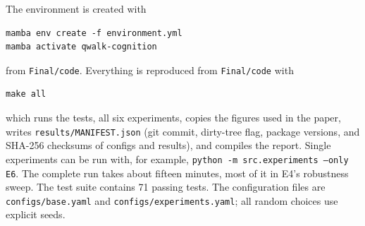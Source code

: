 The environment is created with
\begin{verbatim}
mamba env create -f environment.yml
mamba activate qwalk-cognition
\end{verbatim}
from \texttt{Final/code}. Everything is reproduced from \texttt{Final/code} with
\begin{verbatim}
make all
\end{verbatim}
which runs the tests, all six experiments, copies the figures used in the paper,
writes \texttt{results/MANIFEST.json} (git commit, dirty-tree flag, package
versions, and SHA-256 checksums of configs and results), and compiles the report.
Single experiments can be run with, for example,
\texttt{python -m src.experiments --only E6}. The complete run takes about
fifteen minutes, most of it in E4's robustness sweep. The test suite contains 71
passing tests. The configuration files are \texttt{configs/base.yaml} and
\texttt{configs/experiments.yaml}; all random choices use explicit seeds.

